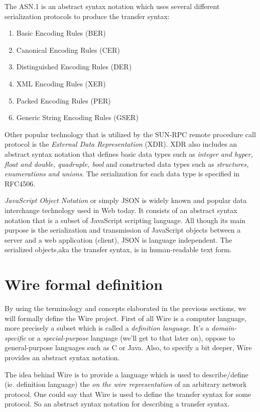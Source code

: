 \documentclass[times, utf8, diplomski]{fer}
\begin{document}
The ASN.1 is an abstract syntax notation which uses several different serialization 
protocols to produce the transfer syntax:
\begin{enumerate}
	\item Basic Encoding Rules (BER)
	\item Canonical Encoding Rules (CER)
	\item Distinguished Encoding Rules (DER)
	\item XML Encoding Rules (XER)
	\item Packed Encoding Rules (PER)
	\item Generic String Encoding Rules (GSER)
\end{enumerate}

Other popular technology that is utilized by the SUN-RPC remote procedure call
protocol is the \emph{External Data Representation} (XDR). XDR also includes 
an abstract syntax notation that defines basic data types such as \emph{integer 
and hyper, float and double, quadruple, bool} and constructed data types such 
as \emph{structures, enumerations and unions}. The serialization for each data 
type is specified in RFC4506.

\emph{JavaScript Object Notation} or simply JSON is widely known and popular 
data interchange technology used in Web today. It consists of an abstract syntax 
notation that is a subset of JavaScript scripting language. All though its main 
purpose is the serialization and transmission of JavaScript objects between a 
server and a web application (client), JSON is language independent. 
The serialized objects,aka the transfer syntax, is in human-readable text form.

\section{Wire formal definition}
By using the terminology and concepts elaborated in the previous sections, we will 
formally define the Wire project. First of all Wire is a computer language, more 
precisely a subset which is called a \emph{definition language}. It's a 
\emph{domain-specific} or a \emph{special-purpose} language (we'll get to that 
later on), oppose to general-purpose languages such as C or Java. Also, to specify 
a bit deeper, Wire provides an abstract syntax notation.

The idea behind Wire is to provide a language which is used to describe/define 
(ie. definition language) the \emph{on the wire representation} of an 
arbitrary network protocol. One could say that Wire is used to define the transfer 
syntax for some protocol. So an abstract syntax notation for describing a transfer syntax.
\end{document}
